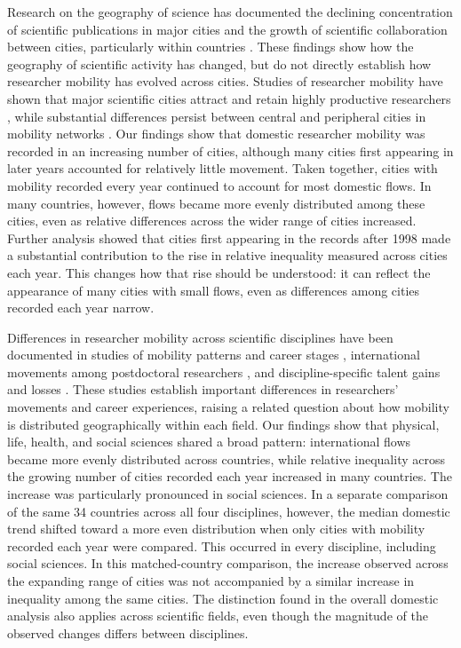 Research on the geography of science has documented the declining concentration of scientific publications in major cities \cite{ref015} and the growth of scientific collaboration between cities, particularly within countries \cite{ref016}. These findings show how the geography of scientific activity has changed, but do not directly establish how researcher mobility has evolved across cities. Studies of researcher mobility have shown that major scientific cities attract and retain highly productive researchers \cite{ref031}, while substantial differences persist between central and peripheral cities in mobility networks \cite{ref032}. Our findings show that domestic researcher mobility was recorded in an increasing number of cities, although many cities first appearing in later years accounted for relatively little movement. Taken together, cities with mobility recorded every year continued to account for most domestic flows. In many countries, however, flows became more evenly distributed among these cities, even as relative differences across the wider range of cities increased. Further analysis showed that cities first appearing in the records after 1998 made a substantial contribution to the rise in relative inequality measured across cities each year. This changes how that rise should be understood: it can reflect the appearance of many cities with small flows, even as differences among cities recorded each year narrow.

Differences in researcher mobility across scientific disciplines have been documented in studies of mobility patterns and career stages \cite{ref033}, international movements among postdoctoral researchers \cite{ref035}, and discipline-specific talent gains and losses \cite{ref034}. These studies establish important differences in researchers' movements and career experiences, raising a related question about how mobility is distributed geographically within each field. Our findings show that physical, life, health, and social sciences shared a broad pattern: international flows became more evenly distributed across countries, while relative inequality across the growing number of cities recorded each year increased in many countries. The increase was particularly pronounced in social sciences. In a separate comparison of the same 34 countries across all four disciplines, however, the median domestic trend shifted toward a more even distribution when only cities with mobility recorded each year were compared. This occurred in every discipline, including social sciences. In this matched-country comparison, the increase observed across the expanding range of cities was not accompanied by a similar increase in inequality among the same cities. The distinction found in the overall domestic analysis also applies across scientific fields, even though the magnitude of the observed changes differs between disciplines.

